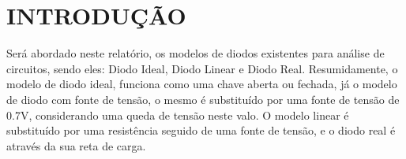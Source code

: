 \chapter{INTRODUÇÃO}

Será abordado neste relatório, os modelos de diodos existentes para análise de circuitos, sendo eles: Diodo Ideal, Diodo Linear e Diodo Real. Resumidamente, o modelo de diodo ideal, funciona como uma chave aberta ou fechada, já o modelo de diodo com fonte de tensão, o mesmo é substituído por uma fonte de tensão de 0.7V, considerando uma queda de tensão neste valo. O modelo linear é substituído por uma resistência seguido de uma fonte de tensão, e o diodo real é através da sua reta de carga.
